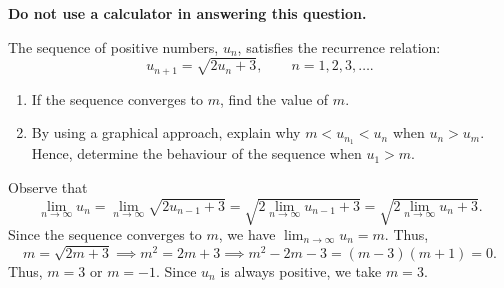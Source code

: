 \begin{problem}
    \textbf{Do not use a calculator in answering this question.}

    The sequence of positive numbers, $u_n$, satisfies the recurrence relation: \[u_{n+1} = \sqrt{2u_n + 3}, \qquad n = 1, 2, 3, \ldots.\]

    \begin{enumerate}
        \item If the sequence converges to $m$, find the value of $m$.
        \item By using a graphical approach, explain why $m < u_{n_1} < u_n$ when $u_n > u_m$. Hence, determine the behaviour of the sequence when $u_1 > m$.
    \end{enumerate}
\end{problem}
\begin{solution}
    \begin{ppart}
        Observe that \[\lim_{n \to \infty} u_n = \lim_{n \to \infty} \sqrt{2u_{n-1} + 3} = \sqrt{2\lim_{n \to \infty} u_{n-1} + 3} = \sqrt{2\lim_{n \to \infty} u_n + 3}.\] Since the sequence converges to $m$, we have $\lim_{n \to \infty} u_n = m$. Thus, \[m = \sqrt{2m + 3} \implies m^2 = 2m+3 \implies m^2-2m-3 = (m-3)(m+1) = 0.\] Thus, $m = 3$ or $m = -1$. Since $u_n$ is always positive, we take $m = 3$.
    \end{ppart}
    \begin{ppart}
        \begin{center}
\end{center}
\end{ppart}
\end{solution}
